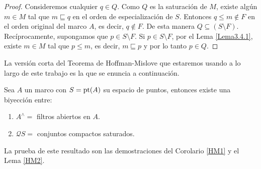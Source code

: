 \begin{proof}
    Consideremos cualquier $q\in Q$. Como $Q$ es la saturación de $M$, existe algún $m\in M$ tal que $m\sqsubseteq q$ en el orden de especialización de $S$. Entonces $q\leq m\notin F$ en el orden original del marco $A$, es decir, $q\notin F$. De esta manera $Q\subseteq (S\setminus F)$.\\

    Recíprocamente, supongamos que $p\in S\setminus F$. Si $p\in S\setminus F$, por el Lema \ref{Lema3.4.1}, existe $m\in M$ tal que $p\leq m$, es decir, $m\sqsubseteq p$ y por lo tanto $p\in Q$.
\end{proof}

La versión corta del Teorema de Hoffman-Mislove que estaremos usando a lo largo de este trabajo es la que se enuncia a continuación.

\begin{thm}\label{TeoremaHM}

Sea $A$ un marco con $S=\mathrm{pt}(A)$ su espacio de puntos, entonces existe una biyección entre:

\begin{enumerate}[$i)$]

\item $A^{\wedge}=$ filtros abiertos en $A$.

\item $\mathcal{Q}S=$ conjuntos compactos saturados.

\end{enumerate}
\end{thm}

La prueba de este resultado son las demostraciones del Corolario \ref{HM1} y el Lema \ref{HM2}.


